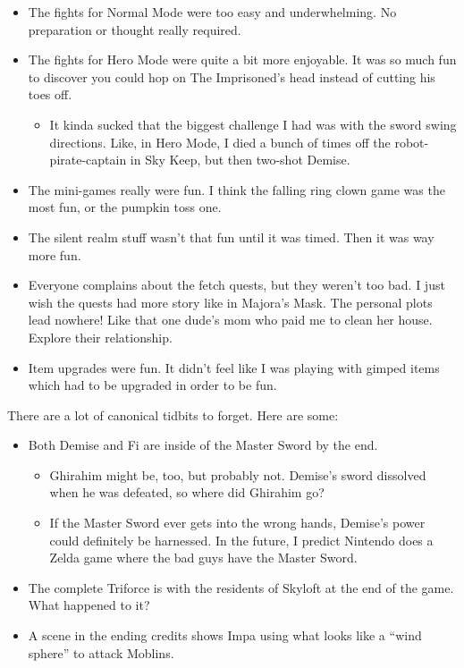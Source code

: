 \begin{itemize}
	\item{The fights for Normal Mode were too easy and underwhelming. No preparation or thought really required.}
	\item{The fights for Hero Mode were quite a bit more enjoyable. It was so much fun to discover you could hop on The Imprisoned's head instead of cutting his toes off.
		\begin{itemize}
			\item{It kinda sucked that the biggest challenge I had was with the sword swing directions. Like, in Hero Mode, I died a bunch of times off the robot-pirate-captain in Sky Keep, but then two-shot Demise.}
		\end{itemize}
	}
 \item{The mini-games really were fun. I think the falling ring clown game was the most fun, or the pumpkin toss one.}
 \item{The silent realm stuff wasn't that fun until it was timed. Then it was way more fun.}
 \item{Everyone complains about the fetch quests, but they weren't too bad. I just wish the 
	quests had more story like in Majora's Mask. The personal plots lead nowhere! Like
	that one dude's mom who paid me to clean her house. Explore their relationship.}
 \item{Item upgrades were fun. It didn't feel like I was playing with gimped items which
	had to be upgraded in order to be fun.}
\end{itemize}


\newpage
{}
There are a lot of canonical tidbits to forget. Here are some:
\begin{itemize}
	\item{Both Demise and Fi are inside of the Master Sword by the end.
		\begin{itemize}
			\item{Ghirahim might be, too, but probably not. Demise's sword dissolved when he was defeated, so where did Ghirahim go?}
			\item{If the Master Sword ever gets into the wrong hands, Demise's power could definitely be harnessed. In the future, I predict Nintendo does a Zelda game where the bad guys have the Master Sword.}
		\end{itemize}
	}
	\item{The complete Triforce is with the residents of Skyloft at the end of the game. What happened to it?}
	\item{A scene in the ending credits shows Impa using what looks like a ``wind sphere'' to attack Moblins.}
\end{itemize}


